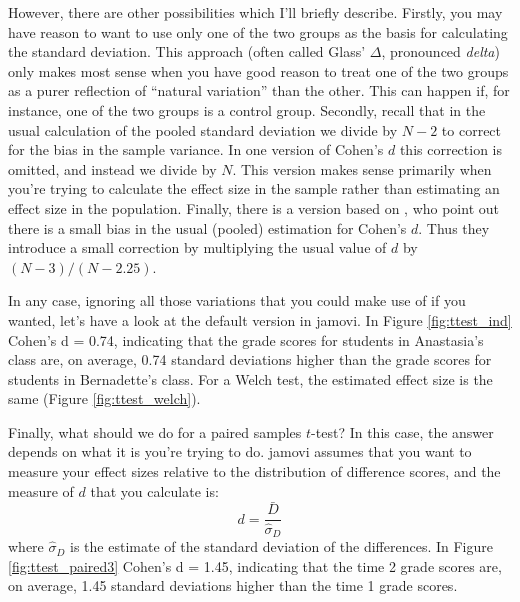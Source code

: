 However, there are other possibilities which I'll briefly describe. Firstly, you may have reason to want to use only one of the two groups as the basis for calculating the standard deviation. This approach (often called Glass' $\Delta$, pronounced {\it delta}) only makes most sense when you have good reason to treat one of the two groups as a purer reflection of ``natural variation'' than the other. This can happen if, for instance, one of the two groups is a control group. Secondly, recall that in the usual calculation of the pooled standard deviation we divide by $N-2$ to correct for the bias in the sample variance. In one version of Cohen's $d$ this correction is omitted, and instead we divide by $N$. This version makes sense primarily when you're trying to calculate the effect size in the sample rather than estimating an effect size in the population. Finally, there is a version based on \textcite{Hedges1985}, who point out there is a small bias in the usual (pooled) estimation for Cohen's $d$. Thus they introduce a small correction by multiplying the usual value of $d$ by $(N-3)/(N-2.25)$. 

In any case, ignoring all those variations that you could make use of if you wanted, let's have a look at the default version in jamovi. In Figure \ref{fig:ttest_ind} Cohen's d = 0.74, indicating that the grade scores for students in Anastasia's class are, on average, 0.74 standard deviations higher than the grade scores for students in Bernadette's class. For a Welch test, the estimated effect size is the same (Figure \ref{fig:ttest_welch}).


Finally, what should we do for a paired samples $t$-test? In this case, the answer depends on what it is you're trying to do. jamovi assumes that you want to measure your effect sizes relative to the distribution of difference scores, and the measure of $d$ that you calculate is: 
$$
d = \frac{\bar{D}}{\hat{\sigma}_D}
$$
where $\hat{\sigma}_D$ is the estimate of the standard deviation of the differences. In Figure \ref{fig:ttest_paired3} Cohen's d = 1.45, indicating that the time 2 grade scores are, on average, 1.45 standard deviations higher than the time 1 grade scores.

